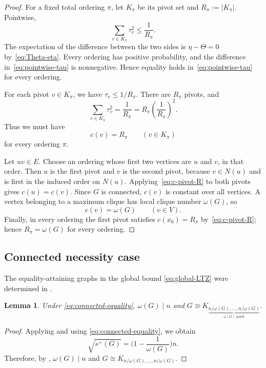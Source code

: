 \documentclass[11pt]{article}
\numberwithin{equation}{section}
\newtheorem{lemma}[theorem]{Lemma}
\theoremstyle{definition}
\theoremstyle{remark}
\newcommand{\splus}{s^{+}}
\begin{document}
\begin{proof}
		For a fixed total ordering $\pi$, let $K_\pi$ be its pivot set and
		$R_\pi:=|K_\pi|$.  Pointwise,
		\begin{equation}\label{eq:pointwise-tau}
			\sum_{v\in K_\pi}\tau_v^2\leq\frac1{R_\pi}.
		\end{equation}
		The expectation of the difference between the two sides is
		$\eta-\Theta=0$ by~\eqref{eq:Theta-eta}.  Every ordering has positive
		probability, and the difference in~\eqref{eq:pointwise-tau} is
		nonnegative.  Hence equality holds in~\eqref{eq:pointwise-tau} for every
		ordering.
		
		For each pivot $v\in K_\pi$, we have $\tau_v\leq1/R_\pi$.  There are
		$R_\pi$ pivots, and
		\[
		\sum_{v\in K_\pi}\tau_v^2
		=\frac1{R_\pi}
		=R_\pi\left(\frac1{R_\pi}\right)^2.
		\]
		Thus we must have
		\begin{equation}\label{eq:c-pivot-R}
			c(v)=R_\pi
			\qquad
			(v\in K_\pi)
		\end{equation}
		for every ordering $\pi$.
		
		Let $uv\in E$.  Choose an ordering whose first two vertices are $u$
		and $v$, in that order.  Then $u$ is the first pivot and $v$ is the
		second pivot, because $v\in N(u)$ and is first in the induced order on
		$N(u)$.  Applying~\eqref{eq:c-pivot-R} to both pivots gives
		$c(u)=c(v)$.  Since $G$ is connected, $c(v)$ is constant over all
		vertices.  A vertex belonging to a maximum clique has local clique number
		$\omega(G)$, so
		\[
		c(v)=\omega(G)
		\qquad(v\in V).
		\]
		Finally, in every ordering the first pivot satisfies
		$c(x_0)=R_\pi$ by~\eqref{eq:c-pivot-R}; hence
		$R_\pi=\omega(G)$ for every ordering.
	\end{proof}
	
	\subsection{Connected necessity case}
	
	The equality-attaining graphs in the global bound \eqref{eq:global-LTZ} were determined in \cite{jayarajan2026equalitycasepositivesquareenergy}.
	
	
	\begin{lemma}
		Under \eqref{eq:connected-equality}, $\omega(G) \mid n$ and  $G\cong K_{\underbrace{n/\omega(G),\ldots,n/\omega(G)}_{\omega(G)\text{ parts}}}$.
	\end{lemma}
	\begin{proof}
		Applying  and using \eqref{eq:connected-equality}, we obtain
		\begin{equation*}
			\sqrt{\splus(G)}=\bigg(1-\dfrac{1}{\omega(G)}\bigg)n.
		\end{equation*}
		Therefore, by , $\omega(G) \mid n$ and $G\cong K_{n/\omega(G),\ldots,n/\omega(G)}$.
		
	\end{proof}
	
\end{document}
